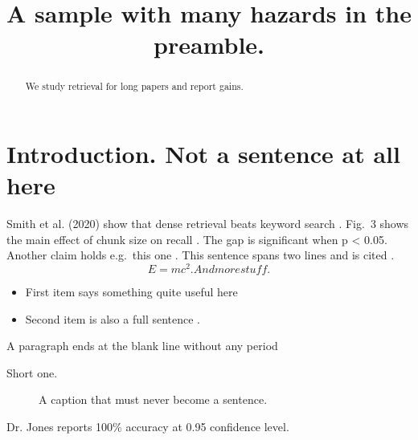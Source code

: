 \documentclass{article}
\title{A sample with many hazards in the preamble.}
\begin{document}
\maketitle
\begin{abstract}
We study retrieval for long papers and report gains.
\end{abstract}
\section{Introduction. Not a sentence at all here}
Smith et al. (2020) show that dense retrieval beats keyword search \citep{smith2020}.
Fig.~3 shows the main effect of chunk size on recall \citep{a,b}.
The gap is significant when p < 0.05. Another claim holds e.g.\ this one \citet{lee19}.
This sentence spans
two lines and is cited \citep{span}.
\begin{equation}
  E = mc^2. And more stuff.
\end{equation}
\begin{itemize}
\item First item says something quite useful here
\item Second item is also a full sentence \citep{item2}.
\end{itemize}
A paragraph ends at the blank line without any period

Short one.
\begin{figure}
\caption{A caption that must never become a sentence.}
\end{figure}
Dr. Jones reports 100\% accuracy at 0.95 confidence level.
\end{document}
